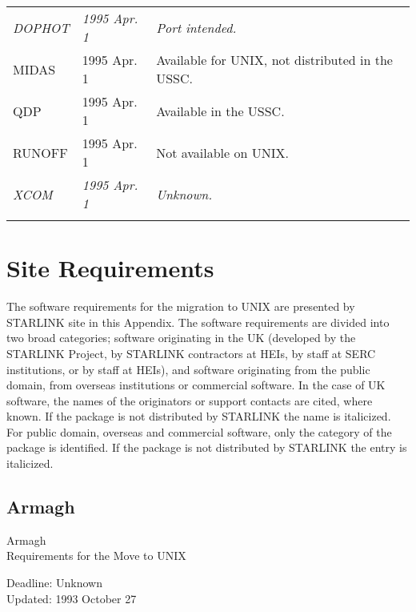 \begin{table}
\begin{center}
\begin{tabular}{|p{36mm}|p{30mm}|p{60mm}|}
{\em DOPHOT}          & {\em 1995 Apr. 1} & {\em Port intended.} \\
MIDAS                 & 1995 Apr. 1 & Available for UNIX, not distributed in 
   the USSC. \\
QDP                   & 1995 Apr. 1 & Available in the USSC. \\
RUNOFF                & 1995 Apr. 1 & Not available on UNIX. \\
{\em XCOM}            & {\em 1995 Apr. 1} & {\em Unknown.} \\
& & \\ \hline
\end{tabular}
\end{center}
\end{table}

\appendix
\newpage
\section{Site Requirements}

The software requirements for the migration to UNIX are presented by STARLINK
site in this Appendix.
The software requirements are divided into two broad categories; software 
originating in the UK (developed by the STARLINK Project, by STARLINK 
contractors at HEIs, by staff at SERC institutions, or by staff at HEIs), and
software originating from the public domain, from overseas institutions or 
commercial software.
In the case of UK software, the names of the originators or support contacts
are cited, where known.
If the package is not distributed by STARLINK the name is italicized.
For public domain, overseas and commercial software, only the category of the 
package is identified.
If the package is not distributed by STARLINK the entry is italicized.


\newpage
\subsection{Armagh}

\renewcommand{\starsitename}{Armagh}
\renewcommand{\starnodename}{ARVAD}

\renewcommand{\starunixdate}{Unknown}
\renewcommand{\starupdate}{1993 October 27}

\renewcommand{\starsitetelephone}{0861 522928}
\renewcommand{\starsitefax}{0861 527174}

\begin{center}
{\Large\sc \starsitename \\ [2ex]
           Requirements for the Move to UNIX}

\vspace{3mm}
{\large\sc Deadline: \starunixdate \\ [1ex]
           Updated: \starupdate}
\end{center}

